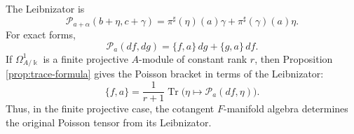 \documentclass[12pt,reqno]{amsart}
\theoremstyle{definition}
\theoremstyle{remark}
\newcommand{\kk}{\Bbbk}
\newcommand{\Pcal}{\mathcal P}
\begin{document}
	
	The Leibnizator is
	\begin{equation}\label{eq:cot-Leibnizator}
		\Pcal_{a+\alpha}(b+\eta,c+\gamma)
		=\pi^\sharp(\eta)(a)\gamma+\pi^\sharp(\gamma)(a)\eta.
	\end{equation}
	For exact forms,
	\begin{equation}\label{eq:cot-exact-Leibnizator}
		\Pcal_a(df,dg)=\{f,a\}\,dg+\{g,a\}\,df.
	\end{equation}
	If $\Omega^1_{A/\kk}$ is a finite projective $A$-module of constant rank $r$, then
	Proposition \ref{prop:trace-formula} gives the Poisson bracket in terms of the
	Leibnizator:
	\begin{equation}\label{eq:poisson-from-cotangent-trace}
		\{f,a\}=\frac1{r+1}\operatorname{Tr}\bigl(\eta\mapsto\Pcal_a(df,\eta)\bigr).
	\end{equation}
	Thus, in the finite projective case, the cotangent $F$-manifold algebra
	determines the original Poisson tensor from its Leibnizator.
	
%	
%	
%	
	
\end{document}
